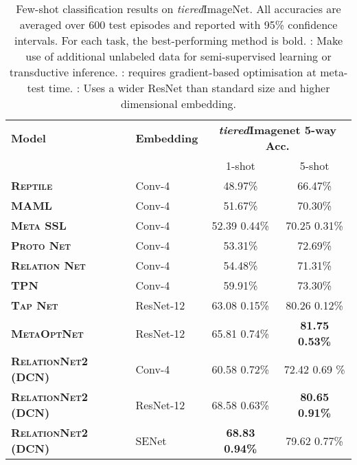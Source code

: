 \documentclass[conference]{IEEEtran}
\def\modelnameshort{DCN}
\def\tierIN{\textit{tiered}ImageNet}
\begin{document}
\setlength{\tabcolsep}{4.8pt}
\begin{table}[t]
\centering
\footnotesize
\begin{tabular}{@{} llcc @{}}
\toprule
\multirow{2}{*}{\bf Model}  &\multirow{2}{*}{\bf Embedding} &\multicolumn{2}{c}{\multirow{2}{*}{\bf \textit{tiered}Imagenet 5-way Acc.}}\\
& \multicolumn{2}{c}{}  \\
&& 1-shot & 5-shot \\
\midrule 

\textbf{\textsc{Reptile}}  \cite{liu2018transductive}& Conv-4 &48.97\%  &66.47\% \\
\textbf{\textsc{MAML}} \cite{liu2018transductive} & Conv-4&  51.67\% & 70.30\% \\ 
\textbf{\textsc{Meta SSL}} \cite{ren2018meta}&Conv-4& 52.39  0.44\% & 70.25  0.31\% \\
\textbf{\textsc{Proto Net}} \cite{liu2018transductive} &Conv-4&53.31\%  &72.69\% \\ 
\textbf{\textsc{Relation} \textsc{Net}} \cite{liu2018transductive} &Conv-4& 54.48\% &71.31\% \\ 
\textbf{\textsc{TPN}} \cite{liu2018transductive}&Conv-4& 59.91\% & 73.30\% \\

\textbf{\textsc{Tap Net}} \cite{yoon2019tapnet} & ResNet-12& 63.08  0.15\% & 80.26  0.12\% \\

\textbf{\textsc{MetaOptNet}} \cite{lee2019meta} & ResNet-12 & 65.81  0.74\% & \textbf{ 81.75  0.53\% }\\
\midrule
\textbf{\textsc{RelationNet2 (\modelnameshort{})}} & Conv-4 & 60.58  0.72\% & 72.42  0.69 \% \\
\textbf{\textsc{RelationNet2 (\modelnameshort{})}} & ResNet-12 & 68.58  0.63\%  & \textbf{80.65  0.91\%}\\

\textbf{\textsc{RelationNet2 (\modelnameshort{})}} & SENet & \textbf{68.83  0.94\%} & 79.62  0.77\% \\ 

\bottomrule
\end{tabular}\caption{\small \small
Few-shot classification results on \tierIN{}. All accuracies are averaged over 600 test episodes and reported with 95\% confidence intervals. For each task, the best-performing method is bold. : Make use of additional unlabeled data for semi-supervised learning or transductive inference.  : requires gradient-based optimisation at meta-test time. : Uses a wider ResNet than standard size and higher dimensional embedding. 
}
\label{tab:tiered}
\end{table}
\end{document}

